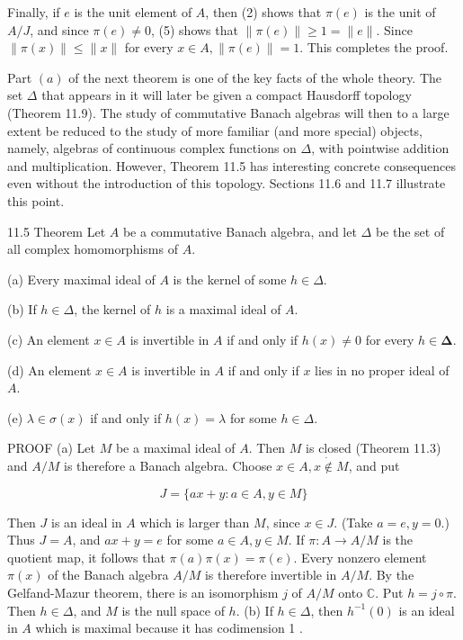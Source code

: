 \documentclass[10pt]{article}
\begin{document}
Finally, if $e$ is the unit element of $A$, then (2) shows that $\pi(e)$ is the unit of $A / J$, and since $\pi(e) \neq 0$, (5) shows that $\|\pi(e)\| \geq 1=\|e\|$. Since $\|\pi(x)\| \leq\|x\|$ for every $x \in A,\|\pi(e)\|=1$. This completes the proof.

Part $(a)$ of the next theorem is one of the key facts of the whole theory. The set $\Delta$ that appears in it will later be given a compact Hausdorff topology (Theorem 11.9). The study of commutative Banach algebras will then to a large extent be reduced to the study of more familiar (and more special) objects, namely, algebras of continuous complex functions on $\Delta$, with pointwise addition and multiplication. However, Theorem 11.5 has interesting concrete consequences even without the introduction of this topology. Sections 11.6 and 11.7 illustrate this point.

11.5 Theorem Let $A$ be a commutative Banach algebra, and let $\Delta$ be the set of all complex homomorphisms of $A$.

(a) Every maximal ideal of $A$ is the kernel of some $h \in \Delta$.

(b) If $h \in \Delta$, the kernel of $h$ is a maximal ideal of $A$.

(c) An element $x \in A$ is invertible in $A$ if and only if $h(x) \neq 0$ for every $h \in \mathbf{\Delta}$.

(d) An element $x \in A$ is invertible in $A$ if and only if $x$ lies in no proper ideal of $A$.

(e) $\lambda \in \sigma(x)$ if and only if $h(x)=\lambda$ for some $h \in \Delta$.

PROOF (a) Let $M$ be a maximal ideal of $A$. Then $M$ is closed (Theorem 11.3) and $A / M$ is therefore a Banach algebra. Choose $x \in A, x \dot{\notin} M$, and put

$$
J=\{a x+y: a \in A, y \in M\}
$$

Then $J$ is an ideal in $A$ which is larger than $M$, since $x \in J$. (Take $a=e, y=0$.) Thus $J=A$, and $a x+y=e$ for some $a \in A, y \in M$. If $\pi: A \rightarrow A / M$ is the quotient map, it follows that $\pi(a) \pi(x)=\pi(e)$. Every nonzero element $\pi(x)$ of the Banach algebra $A / M$ is therefore invertible in $A / M$. By the Gelfand-Mazur theorem, there is an isomorphism $j$ of $A / M$ onto $\mathbb{C}$. Put $h=j \circ \pi$. Then $h \in \Delta$, and $M$ is the null space of $h$.
(b) If $h \in \Delta$, then $h^{-1}(0)$ is an ideal in $A$ which is maximal because it has codimension 1 .
\end{document}
